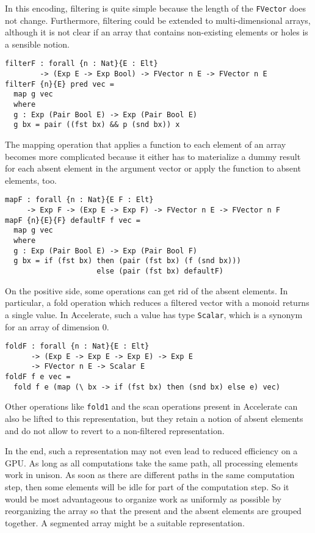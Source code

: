 \documentclass{llncs}
\begin{document}
In this encoding, filtering is quite simple because the length of
the \texttt{FVector} does not change. Furthermore, filtering could be
extended to multi-dimensional arrays, although it is not clear if an
array that contains non-existing elements or holes is a sensible notion.
\begin{verbatim}
filterF : forall {n : Nat}{E : Elt}
        -> (Exp E -> Exp Bool) -> FVector n E -> FVector n E
filterF {n}{E} pred vec =
  map g vec
  where
  g : Exp (Pair Bool E) -> Exp (Pair Bool E)
  g bx = pair ((fst bx) && p (snd bx)) x
\end{verbatim}
The mapping operation that applies a function to each element of an
array becomes more complicated because it either has to 
materialize a dummy result for each absent element in the argument
vector or apply the function to absent elements, too.
\begin{verbatim}
mapF : forall {n : Nat}{E F : Elt}
     -> Exp F -> (Exp E -> Exp F) -> FVector n E -> FVector n F
mapF {n}{E}{F} defaultF f vec =
  map g vec
  where
  g : Exp (Pair Bool E) -> Exp (Pair Bool F)
  g bx = if (fst bx) then (pair (fst bx) (f (snd bx)))
                     else (pair (fst bx) defaultF)
\end{verbatim}
On the positive side, some operations can get rid of the absent
elements. In particular, a fold operation which reduces a filtered
vector with a monoid returns a single value. In Accelerate, such a value has type
\texttt{Scalar}, which is a synonym for an array of dimension $0$.
\begin{verbatim}
foldF : forall {n : Nat}{E : Elt}
      -> (Exp E -> Exp E -> Exp E) -> Exp E
      -> FVector n E -> Scalar E
foldF f e vec =
  fold f e (map (\ bx -> if (fst bx) then (snd bx) else e) vec)
\end{verbatim}
Other operations like \texttt{fold1} and the scan operations present
in Accelerate can also be lifted to this representation, but they
retain a notion of absent elements and do not allow to revert to a
non-filtered representation. 

In the end, such a representation may not even lead to reduced efficiency on a GPU. As long
as all computations take the same path, all processing elements work
in unison. As soon as there are different paths in the same
computation step, then some elements will be idle for part of the
computation step. So it would be most advantageous to organize work as
uniformly as possible by reorganizing the array so that the present
and the absent elements are grouped together. A segmented array might
be a suitable representation.
\end{document}

